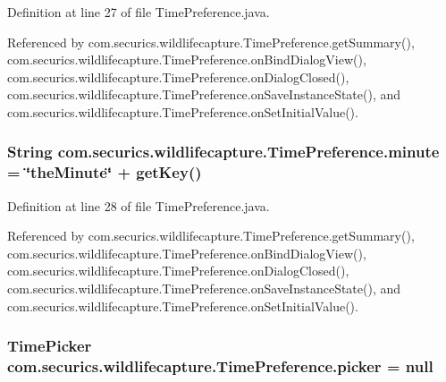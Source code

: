 Definition at line 27 of file Time\+Preference.\+java.



Referenced by com.\+securics.\+wildlifecapture.\+Time\+Preference.\+get\+Summary(), com.\+securics.\+wildlifecapture.\+Time\+Preference.\+on\+Bind\+Dialog\+View(), com.\+securics.\+wildlifecapture.\+Time\+Preference.\+on\+Dialog\+Closed(), com.\+securics.\+wildlifecapture.\+Time\+Preference.\+on\+Save\+Instance\+State(), and com.\+securics.\+wildlifecapture.\+Time\+Preference.\+on\+Set\+Initial\+Value().

\subsubsection[{minute}]{\setlength{\rightskip}{0pt plus 5cm}String com.\+securics.\+wildlifecapture.\+Time\+Preference.\+minute = \char`\"{}the\+Minute\char`\"{} + get\+Key()\hspace{0.3cm}{\ttfamily [private]}}\label{classcom_1_1securics_1_1wildlifecapture_1_1_time_preference_a1b182be6b16555cda598ce517db4cf98}


Definition at line 28 of file Time\+Preference.\+java.



Referenced by com.\+securics.\+wildlifecapture.\+Time\+Preference.\+get\+Summary(), com.\+securics.\+wildlifecapture.\+Time\+Preference.\+on\+Bind\+Dialog\+View(), com.\+securics.\+wildlifecapture.\+Time\+Preference.\+on\+Dialog\+Closed(), com.\+securics.\+wildlifecapture.\+Time\+Preference.\+on\+Save\+Instance\+State(), and com.\+securics.\+wildlifecapture.\+Time\+Preference.\+on\+Set\+Initial\+Value().

\subsubsection[{picker}]{\setlength{\rightskip}{0pt plus 5cm}Time\+Picker com.\+securics.\+wildlifecapture.\+Time\+Preference.\+picker = null\hspace{0.3cm}{\ttfamily [private]}}\label{classcom_1_1securics_1_1wildlifecapture_1_1_time_preference_ae0b342584072cfbd27dfae91a4895047}


